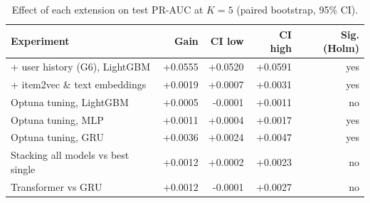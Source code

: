 \begin{table}[t]
\centering
\caption{Effect of each extension on test PR-AUC at $K=5$ (paired bootstrap, 95\% CI).}
\label{tab:ext}
\footnotesize
\begin{tabular}{lrrrr}
\toprule
Experiment & Gain & CI low & CI high & Sig. (Holm) \\
\midrule
+ user history (G6), LightGBM & +0.0555 & +0.0520 & +0.0591 & yes \\
+ item2vec \& text embeddings & +0.0019 & +0.0007 & +0.0031 & yes \\
Optuna tuning, LightGBM & +0.0005 & -0.0001 & +0.0011 & no \\
Optuna tuning, MLP & +0.0011 & +0.0004 & +0.0017 & yes \\
Optuna tuning, GRU & +0.0036 & +0.0024 & +0.0047 & yes \\
Stacking all models vs best single & +0.0012 & +0.0002 & +0.0023 & no \\
Transformer vs GRU & +0.0012 & -0.0001 & +0.0027 & no \\
\bottomrule
\end{tabular}
\end{table}

